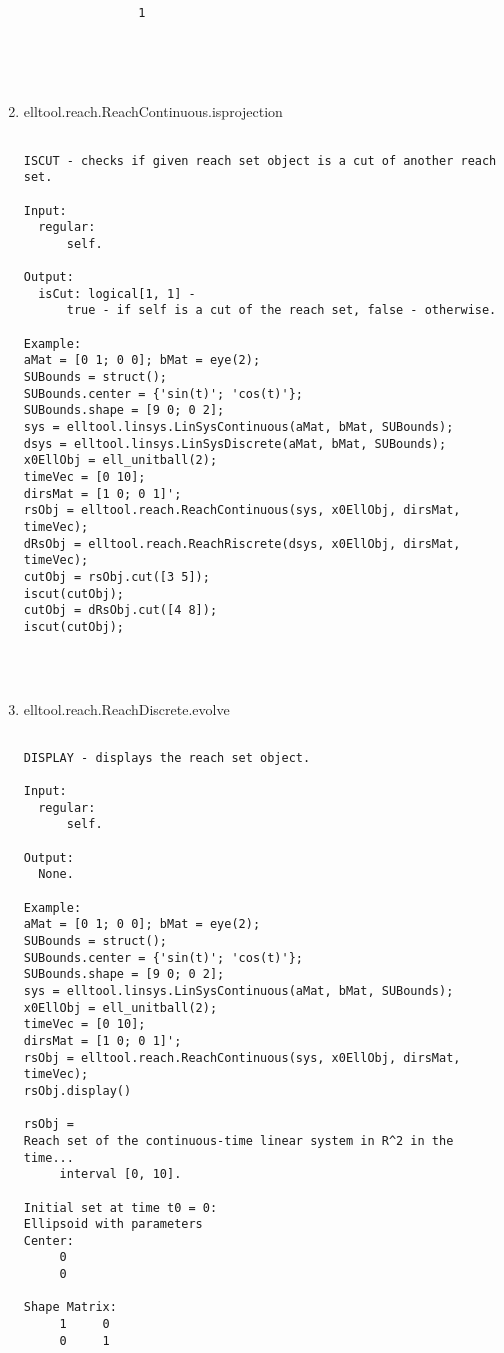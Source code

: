 \begin{enumerate}
\begin{lstlisting}
                1





\end{lstlisting}
\fontfamily{\familydefault}
\selectfont
\item {elltool.reach.ReachContinuous.isprojection}
\selectfont
\begin{lstlisting}

ISCUT - checks if given reach set object is a cut of another reach set.

Input:
  regular:
      self.

Output:
  isCut: logical[1, 1] -
      true - if self is a cut of the reach set, false - otherwise.

Example:
aMat = [0 1; 0 0]; bMat = eye(2);
SUBounds = struct();
SUBounds.center = {'sin(t)'; 'cos(t)'};
SUBounds.shape = [9 0; 0 2];
sys = elltool.linsys.LinSysContinuous(aMat, bMat, SUBounds);
dsys = elltool.linsys.LinSysDiscrete(aMat, bMat, SUBounds);
x0EllObj = ell_unitball(2);
timeVec = [0 10];
dirsMat = [1 0; 0 1]';
rsObj = elltool.reach.ReachContinuous(sys, x0EllObj, dirsMat, timeVec);
dRsObj = elltool.reach.ReachRiscrete(dsys, x0EllObj, dirsMat, timeVec);
cutObj = rsObj.cut([3 5]);
iscut(cutObj);
cutObj = dRsObj.cut([4 8]);
iscut(cutObj);




\end{lstlisting}
\fontfamily{\familydefault}
\selectfont
\item {elltool.reach.ReachDiscrete.evolve}
\selectfont
\begin{lstlisting}

DISPLAY - displays the reach set object.

Input:
  regular:
      self.

Output:
  None.

Example:
aMat = [0 1; 0 0]; bMat = eye(2);
SUBounds = struct();
SUBounds.center = {'sin(t)'; 'cos(t)'};
SUBounds.shape = [9 0; 0 2];
sys = elltool.linsys.LinSysContinuous(aMat, bMat, SUBounds);
x0EllObj = ell_unitball(2);
timeVec = [0 10];
dirsMat = [1 0; 0 1]';
rsObj = elltool.reach.ReachContinuous(sys, x0EllObj, dirsMat, timeVec);
rsObj.display()

rsObj =
Reach set of the continuous-time linear system in R^2 in the time...
     interval [0, 10].

Initial set at time t0 = 0:
Ellipsoid with parameters
Center:
     0
     0

Shape Matrix:
     1     0
     0     1


\end{lstlisting}
\end{enumerate}
